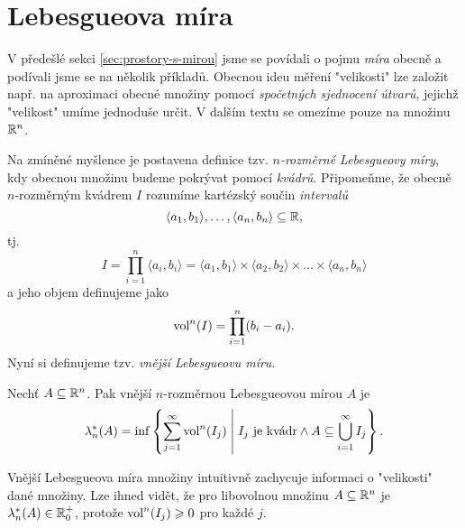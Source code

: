 \section{Lebesgueova míra}\label{sec:lebesgueova-mira}


V předešlé sekci \ref{sec:prostory-s-mirou} jsme se povídali o pojmu \emph{míra} obecně a podívali jsme se na několik příkladů. Obecnou ideu měření "velikosti" lze založit např. na aproximaci obecné množiny pomocí \emph{spočetných sjednocení útvarů}, jejichž "velikost" umíme jednoduše určit. V dalším textu se omezíme pouze na množinu $\mathbb{R}^n$.

Na zmíněné myšlence je postavena definice tzv. \emph{$n$-rozměrné Lebesgueovy míry}, kdy obecnou množinu budeme pokrývat pomocí \emph{kvádrů}. Připomeňme, že obecně \mbox{$n$-rozměrným} kvádrem $I$ rozumíme kartézský součin \emph{intervalů}
\[\langle a_1,b_1\rangle,\ldots,\langle a_n,b_n\rangle\subseteq\mathbb{R},\]
tj.
\[I=\prod_{i=1}^{n}\langle a_i,b_i\rangle=\langle a_1,b_1\rangle\times\langle a_2,b_2\rangle\times\dots\times\langle a_n,b_n\rangle\]
a jeho objem definujeme jako
\[\operatorname{vol}^n(I)=\prod_{i=1}^{n}(b_i-a_i).\]
Nyní si definujeme tzv. \emph{vnější Lebesgueovu míru}.
\begin{definition}\label{def:vnejsi-lebegueova-mira}
    Nechť $A\subseteq\mathbb{R}^n$. Pak vnější $n$-rozměr\-nou Lebesgueovou mírou $A$ je
    \[\lambda_n^*(A)=\inf\left\{\sum_{j=1}^{\infty}\operatorname{vol}^n(I_j)\;\middle|\;\text{$I_j$ je kvádr}\land A\subseteq\bigcup_{i=1}^\infty I_j\right\}.\]
\end{definition}
Vnější Lebesgueova míra množiny intuitivně zachycuje informaci o "velikosti" dané množiny.  Lze ihned vidět, že pro libovolnou množinu $A\subseteq\mathbb{R}^n$ je $\lambda_n^*(A)\in\mathbb{R}_0^+$, protože $\operatorname{vol}^n(I_j)\geqslant0$ pro každé $j$.
